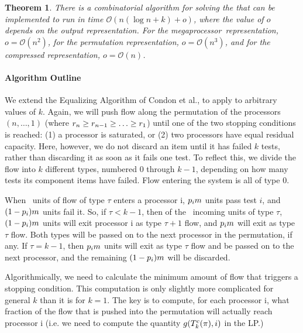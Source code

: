 \documentclass{article}
\newcounter{thmcount}
\newcounter{ass}
\newtheorem{thm}[thmcount]{Theorem}
\newcommand{\ens}[1]{\ensuremath{#1}}					\newcommand{\card}[1]{\ens{|#1|}}							\newcommand{\dotlist}[2]{\ens{#1,\ldots,#2}}
\newcommand{\bigoh}[1]{\ens{\mathcal{O}(#1)}}				\newcommand{\bigom}[1]{\ens{\Omega(#1)}}
\newcommand{\valn}{\ens{n}}
\newcommand{\valk}{\ens{k}}
\newcommand{\flowtype}{\ens{\tau}}
\newcommand{\processor}{processor}
\newcommand{\megaprocessor}{mega\processor}
\begin{document}
\begin{thm}
\label{thm:alg}
There is a
combinatorial algorithm for solving the {\cmt} that can be implemented to run in time
$\bigoh{n(\log n + k) + o}$, where the value of $o$ depends on the output representation.
For the \megaprocessor\ representation, $o = \bigoh{n^2}$, for the permutation representation,
$o = \bigoh{n^3}$, and for the compressed representation, $o=\bigoh{n}$. 
\end{thm}

\paragraph{Algorithm Outline}
We extend the
Equalizing Algorithm of Condon et al., to apply to 
arbitrary values of $\valk$.
Again, we will push flow along the permutation of the {\processor}s
$(\valn, \ldots, 1)$ (where $\rate{\valn} \geq \rate{n-1} \geq \ldots \geq \rate 1$)
until one of the two stopping conditions is reached: 
(1) a {\processor} is saturated, or
(2) two {\processor}s
have equal residual capacity.
Here, however, we do not discard an item until it has failed $\valk$
tests, rather than discarding it as soon as it fails one test.
To reflect this, we divide the flow into $\valk$ different types, numbered
0 through $\valk-1$, depending
on how many tests its component items have failed.
Flow entering the system is all of type 0.

When \flowamt\ units of flow of type \flowtype{} enters a {\processor} \op i,
$\pr i\flowamt$ units pass test $i$, and $(1-\pr i)\flowamt$ units
fail it.  So, if $\flowtype < k-1$, then of the \flowamt\ incoming
units of type \flowtype, $(1-\pr i)\flowamt$ units 
will exit {\processor} \op i
as type $\flowtype+1$ flow, and $\pr i\flowamt$ will exit as type \flowtype{}
flow.  Both types will be passed on to the next {\processor} in
the permutation, if any.
If $\flowtype = k-1$, then $\pr i\flowamt$ units will exit as
type \flowtype{} flow and be passed on to
the next {\processor}, and the remaining $(1-\pr i)\flowamt$ will be discarded.

Algorithmically, we need to calculate the minimum amount of
flow that triggers a stopping condition.  This computation is
only slightly more complicated for general $\valk$ than it is for $\valk = 1$.
The key is to compute,
for each {\processor} \op i, what fraction of the flow that is pushed into
the permutation will actually reach {\processor} \op i (i.e. we need to
compute the quantity $g(\cstrat{k}{\perm},i)$ in the LP.)
\end{document}
